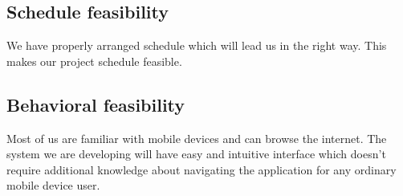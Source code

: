 	\subsection{Schedule feasibility}
We have properly arranged schedule which will lead us in the right way. This makes our project schedule feasible.

	\subsection{Behavioral feasibility}
Most of us are familiar with mobile devices and can browse the internet. The system we are developing will have easy and intuitive interface which doesn't require additional knowledge about navigating the application for any ordinary mobile device user.
